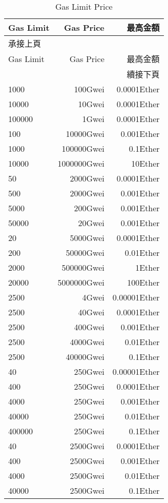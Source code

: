 \documentclass[12pt, a4paper]{article}
\begin{document}
\begin{longtable}{@{}lrr@{}}
\caption{Gas Limit Price}
\label{tb:Gaslimitprice}\\
\toprule
Gas Limit& Gas Price& 最高金額\\
\midrule
\endfirsthead
\multicolumn{3}{l}{承接上頁}\\[2pt]
\toprule
Gas Limit& Gas Price& 最高金額\\
\midrule
\endhead
\midrule
\multicolumn{3}{r}{續接下頁}
\endfoot
\endlastfoot
100     &1000Gwei    &0.0001Ether\\
1000    &100Gwei     &0.0001Ether\\
10000   &10Gwei      &0.0001Ether\\
100000  &1Gwei       &0.0001Ether\\
100     &10000Gwei   &0.001Ether\\
1000    &100000Gwei  &0.1Ether\\
10000   &1000000Gwei &10Ether\\
50      &2000Gwei    &0.0001Ether\\
500     &2000Gwei    &0.001Ether\\
5000    &200Gwei     &0.001Ether\\
50000   &20Gwei      &0.001Ether\\
20      &5000Gwei    &0.0001Ether\\
200     &50000Gwei   &0.01Ether\\
2000    &500000Gwei  &1Ether\\
20000   &5000000Gwei &100Ether\\
2500    &4Gwei       &0.00001Ether\\
2500    &40Gwei      &0.0001Ether\\
2500    &400Gwei     &0.001Ether\\
2500    &4000Gwei    &0.01Ether\\
2500    &40000Gwei   &0.1Ether\\
40      &250Gwei     &0.00001Ether\\
400     &250Gwei     &0.0001Ether\\
4000    &250Gwei     &0.001Ether\\
40000   &250Gwei     &0.01Ether\\
400000  &250Gwei     &0.1Ether\\
40      &2500Gwei    &0.0001Ether\\
400     &2500Gwei    &0.001Ether\\
4000    &2500Gwei    &0.01Ether\\
40000   &2500Gwei    &0.1Ether\\

\end{longtable}
\end{document}
